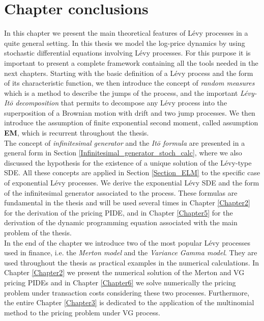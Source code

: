 \section{Chapter conclusions}

In this chapter we present the main theoretical features of Lévy processes in a quite general setting. 
In this thesis we model the log-price dynamics by using stochastic differential equations involving Lévy processes. 
For this purpose it is important to present a complete framework containing all the tools needed in the next chapters.
Starting with the basic definition of a Lévy process and the form of its characteristic function, we then introduce the concept of \emph{random measures}
which is a method to describe the jumps of the process, and the important \emph{Lévy-It\=o decomposition} that permits to decompose any Lévy process into 
the superposition of a Brownian motion with drift and two jump processes.
We then introduce the assumption of finite exponential second moment, called assumption \textbf{EM}, which is recurrent throughout the thesis.\\
The concept of \emph{infinitesimal generator} and the \emph{It\=o formula} are presented in a general form in Section \ref{Infinitesimal_generator_stoch_calc}, where we 
also discussed the hypothesis for the existence of a unique solution of the Lévy-type SDE. 
All these concepts are applied in Section \ref{Section_ELM} to the specific case of exponential Lévy processes. 
We derive the exponential Lévy SDE and the form of the infinitesimal generator associated to the process.   
These formulas are fundamental in the thesis and will be used several times in Chapter \ref{Chapter2} 
for the derivation of the pricing PIDE, and in Chapter \ref{Chapter5} for the derivation of the 
dynamic programming equation associated with the main problem of the thesis.\\
In the end of the chapter we introduce two of the most popular Lévy processes used in finance, i.e. the \emph{Merton model} and the \emph{Variance Gamma model}.
They are used throughout the thesis as practical examples in the numerical calculations.
In Chapter \ref{Chapter2} we present the numerical solution of the Merton and VG pricing PIDEs and 
in Chapter \ref{Chapter6} we solve numerically the pricing problem under transaction costs considering these two processes.
Furthermore, the entire Chapter \ref{Chapter3} is dedicated to the application of the multinomial method to the pricing problem under VG process. 




